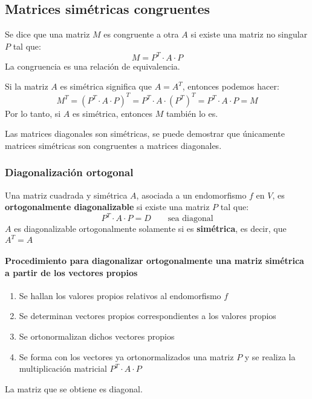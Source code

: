 

\subsection{Matrices simétricas congruentes}

Se dice que una matriz \(M\) es congruente a otra \(A\) si existe una matriz no singular \(P\) tal que:
\[
  M = P^T \cdot A \cdot P
\]
La congruencia es una relación de equivalencia.

Si la matriz \(A\) es simétrica significa que \(A = A^T\), entonces podemos hacer:
\[
  M^T = (P^T \cdot A \cdot P)^T = P^T \cdot A \cdot (P^T)^T = P^T \cdot A \cdot P = M
\]
Por lo tanto, si \(A\) es simétrica, entonces \(M\) también lo es.

Las matrices diagonales son simétricas, se puede demostrar que únicamente matrices simétricas son congruentes a matrices diagonales.

\subsubsection{Diagonalización ortogonal}

Una matriz cuadrada y simétrica \(A\), asociada a un endomorfismo \(f\) en \(V\), es \textbf{ortogonalmente diagonalizable} si existe una matriz \(P\) tal que:
\[
  P^T \cdot A \cdot P = D \qquad \text{sea diagonal}
\]
\(A\) es diagonalizable ortogonalmente solamente si es \textbf{simétrica}, es decir, que \(A^T=A\)

\paragraph{Procedimiento para diagonalizar ortogonalmente una matriz simétrica a partir de los vectores propios}

\begin{enumerate}[label=\arabic{*}^\circ]
  \item Se hallan los valores propios relativos al endomorfismo \(f\)
  \item Se determinan vectores propios correspondientes a los valores propios
  \item Se ortonormalizan dichos vectores propios
  \item Se forma con los vectores ya ortonormalizados una matriz \(P\) y se realiza la multiplicación matricial \(P^T \cdot A \cdot P\)
\end{enumerate}
La matriz que se obtiene es diagonal.

